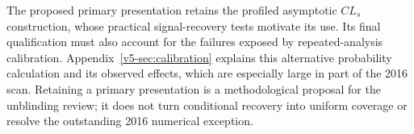 The proposed primary presentation retains the profiled asymptotic
$CL_s$ construction, whose practical signal-recovery tests motivate its
use. Its final qualification must also account for the failures exposed
by repeated-analysis calibration. Appendix~\ref{v5-sec:calibration}
explains this alternative probability calculation and its observed effects,
which are especially large in part of the 2016 scan. Retaining a primary
presentation is a methodological proposal for the unblinding review;
it does not turn conditional recovery into uniform coverage or resolve
the outstanding 2016 numerical exception.
